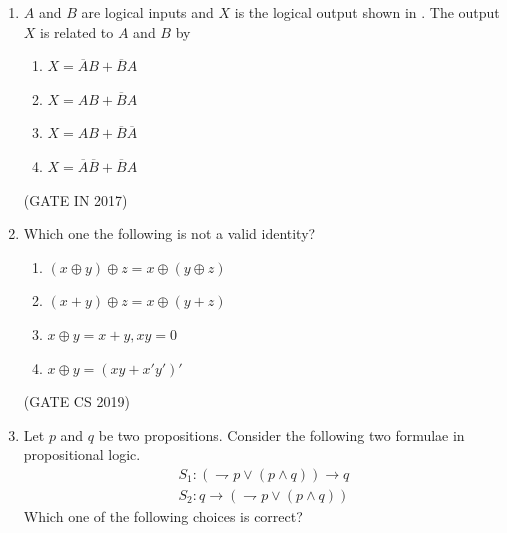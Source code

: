 \begin{enumerate}[label=\arabic*.,ref=\theenumi]
\begin{multicols}{4}
\begin{enumerate}
    \item {}
    \item {}
    \item {}    
    \item {}
\end{enumerate}
	\end{multicols}
%
\item $A$ and $B$ are logical inputs and $X$ is the logical output shown in 
.
	The output $X$ is related to $A$ and $B$ by 
\begin{enumerate}
\item $X = \overline{A}B + \overline{B}A$
\item $X = AB + \overline{B}A$
\item $X = AB + \overline{B}\overline{A}$
\item $X = \overline{A}\overline{B} + \overline{B}A$
\end{enumerate}
\hfill (GATE IN 2017)
\begin{figure}[H]
\centering
\resizebox{0.75\columnwidth}{!}{%

	}
\caption{}
\label{fig:gate_in_2017_30}
\end{figure}
% 
\item 
Which one the following is not a valid identity?
\begin{enumerate}
 \item $ (x\oplus y)\oplus z = x\oplus (y\oplus z)$
 \item $ (x + y)\oplus z = x\oplus (y + z)$
 \item $ x\oplus y = x + y, xy = 0$
 \item $ x\oplus y = (xy + x'y')'$
\end{enumerate}
\hfill{(GATE CS 2019)}
        \item Let $p$ and $q$ be two propositions. Consider the following two formulae in propositional logic.
			\begin{align*}
				 S_1 : ( \rightharpoondown p \vee (p \wedge q))\rightarrow q \\
				 S_2 : q\rightarrow(\rightharpoondown p \vee (p \wedge q))
			\end{align*}
        Which one of the following choices is correct?
		\begin{enumerate}

\end{enumerate}
\end{enumerate}
